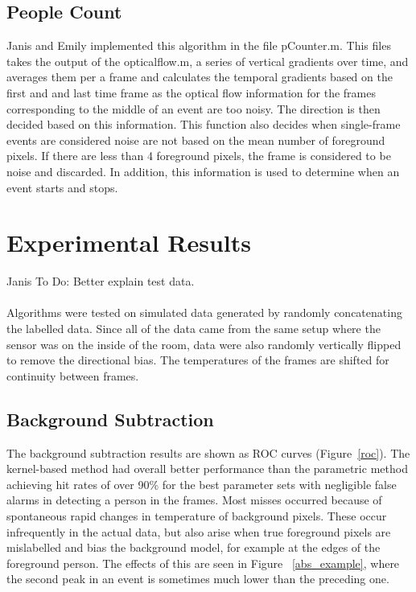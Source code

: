 \documentclass[12pt,oneside]{article} %
\begin{document}
\subsection{People Count}
Janis and Emily implemented this algorithm in the file pCounter.m. This files takes the output of the opticalflow.m, a series of vertical gradients over time, and averages them per a frame and calculates the temporal gradients based on the first and and last time frame as the optical flow information for the frames corresponding to the middle of an event are too noisy. The direction is then decided based on this information. This function also decides when single-frame events are considered noise are not based on the mean number of foreground pixels. If there are less than 4 foreground pixels, the frame is considered to be noise and discarded. In addition, this information is used to determine when an event starts and stops.

\section{Experimental Results}  %
Janis To Do: Better explain test data.
\\ \\
Algorithms were tested on simulated data generated by randomly concatenating the labelled data. Since all
of the data came from the same setup where the sensor was on the inside of the room, data were also
randomly vertically flipped to remove the directional bias.
The temperatures of the frames are shifted for continuity between frames. 

\subsection{Background Subtraction}  %
The background subtraction results are shown as ROC curves (Figure~\ref{roc}).
The kernel-based method
had overall better performance than the parametric method achieving hit rates of over 90\% for the best
parameter sets with negligible false alarms in detecting a person in the frames. Most misses occurred
because of spontaneous rapid changes in temperature of background pixels. These occur infrequently
in the actual data, but also arise when true foreground pixels are mislabelled and bias the background model, for 
example at the edges of the foreground person. The effects of this are seen in Figure~ \ref{abs_example}, where
the second peak in an event is sometimes much lower than the preceding one.
\end{document}

